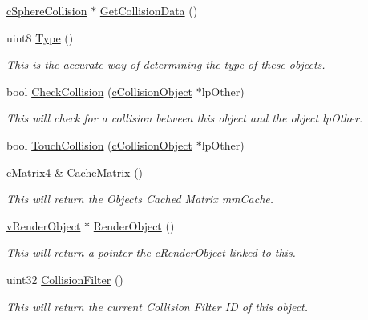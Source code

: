 \begin{DoxyCompactItemize}
\hyperlink{classc_sphere_collision}{cSphereCollision} $\ast$ \hyperlink{classc_collision_object_add80d08291b6c162bdf9b5f7408d6617}{GetCollisionData} ()
\item 
uint8 \hyperlink{classc_collision_object_ae1274b9a69dfa081cda23a840c9e2df4}{Type} ()
\begin{DoxyCompactList}\small\item\em This is the accurate way of determining the type of these objects. \item\end{DoxyCompactList}\item 
bool \hyperlink{classc_collision_object_a6f5b5341a726cb0a54fe3271b110dc8c}{CheckCollision} (\hyperlink{classc_collision_object}{cCollisionObject} $\ast$lpOther)
\begin{DoxyCompactList}\small\item\em This will check for a collision between this object and the object lpOther. \item\end{DoxyCompactList}\item 
bool \hyperlink{classc_collision_object_a1d93858e03da25f8656ae688c4dedbce}{TouchCollision} (\hyperlink{classc_collision_object}{cCollisionObject} $\ast$lpOther)
\item 
\hyperlink{classc_matrix4}{cMatrix4} \& \hyperlink{classc_collision_object_abc47ab584910cc877b5e723be4e09eac}{CacheMatrix} ()
\begin{DoxyCompactList}\small\item\em This will return the Objects Cached Matrix mmCache. \item\end{DoxyCompactList}\item 
\hyperlink{classv_render_object}{vRenderObject} $\ast$ \hyperlink{classc_collision_object_a959994c60b68de6be85dcc663228bab8}{RenderObject} ()
\begin{DoxyCompactList}\small\item\em This will return a pointer the \hyperlink{classc_render_object}{cRenderObject} linked to this. \item\end{DoxyCompactList}\item 
uint32 \hyperlink{classc_collision_object_a1490cdf75c8037049bfa7891aa8756b7}{CollisionFilter} ()
\begin{DoxyCompactList}\small\item\em This will return the current Collision Filter ID of this object. \item\end{DoxyCompactList}\item 

\end{DoxyCompactItemize}
